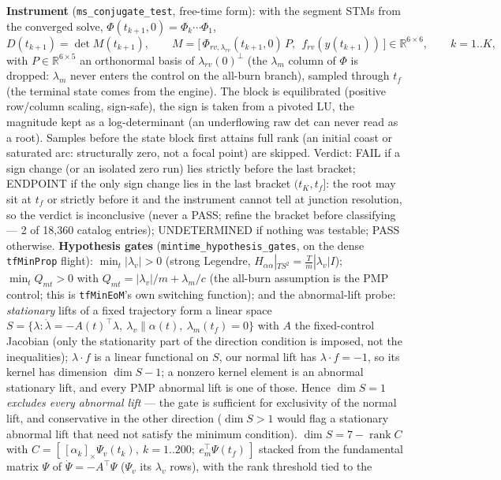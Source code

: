 \documentclass[11pt]{article}
\newcommand{\lv}{\lambda_v}\newcommand{\lr}{\lambda_r}\newcommand{\lm}{\lambda_m}
\newcommand{\tf}{t_f}\newcommand{\R}{\mathbb{R}}
\newcommand{\file}[1]{\texttt{#1}}
\newcommand{\Qmt}{Q_{mt}}
\begin{document}
\begin{rig}
\textbf{Instrument} (\file{ms\_conjugate\_test}, free-time form): with the
segment STMs from the converged solve, $\Phi(t_{k+1},0)=\Phi_k\cdots\Phi_1$,
\[
D(t_{k+1})=\det M(t_{k+1}),\qquad M=\big[\,\Phi_{rv,\lambda_{rv}}(t_{k+1},0)\,P,\ \ f_{rv}(y(t_{k+1}))\,\big]\in\R^{6\times6},\qquad k=1..K,
\]
with $P\in\R^{6\times5}$ an orthonormal basis of $\lambda_{rv}(0)^\perp$ (the $\lm$ column of $\Phi$ is dropped: $\lm$ never enters the control on the all-burn branch), sampled through $\tf$ (the terminal state comes from the engine). The block is
equilibrated (positive row/column scaling, sign-safe), the sign is taken from a
pivoted LU, the magnitude kept as a log-determinant (an underflowing raw det can
never read as a root). Samples before the state block first attains full rank
(an initial coast or saturated arc: structurally zero, not a focal point) are
skipped. Verdict: FAIL if a sign change (or an isolated zero run) lies strictly
before the last bracket; ENDPOINT if the only sign change lies in the last bracket $(t_K,\tf]$: the root may sit at $\tf$ or strictly before it and the instrument cannot tell at junction resolution, so the verdict is inconclusive (never a PASS; refine the bracket before classifying --- 2 of 18,360 catalog entries); UNDETERMINED
if nothing was testable; PASS otherwise.
\textbf{Hypothesis gates} (\file{mintime\_hypothesis\_gates}, on the dense
\file{tfMinProp} flight): $\min_t|\lv|>0$ (strong Legendre,
$H_{\alpha\alpha}|_{TS^2}=\frac{T}{m}|\lv|I$); $\min_t \Qmt>0$ with
$\Qmt=|\lv|/m+\lm/c$ (the all-burn assumption is the PMP control; this is
\file{tfMinEoM}'s own switching function); and the abnormal-lift probe: \emph{stationary} lifts of a fixed trajectory form a linear space $S=\{\lambda:\dot\lambda=-A(t)^{\!\top}\lambda,\ \lv\parallel\alpha(t),\ \lm(\tf)=0\}$ with $A$ the fixed-control Jacobian (only the stationarity part of the direction condition is imposed, not the inequalities); $\lambda\cdot f$ is a linear functional on $S$, our normal lift has $\lambda\cdot f=-1$, so its kernel has dimension $\dim S-1$; a nonzero kernel element is an abnormal stationary lift, and every PMP abnormal lift is one of those. Hence \emph{$\dim S=1$ excludes every abnormal lift} --- the gate is sufficient for exclusivity of the normal lift, and conservative in the other direction ($\dim S>1$ would flag a stationary abnormal lift that need not satisfy the minimum condition). $\dim S=7-\operatorname{rank}C$ with $C=[\,[\alpha_k]_\times\Psi_v(t_k),\ k=1..200;\ e_m^{\!\top}\Psi(\tf)\,]$ stacked from the fundamental matrix $\Psi$ of $\dot\Psi=-A^{\!\top}\Psi$ ($\Psi_v$ its $\lv$ rows), with the rank threshold tied to the

\end{rig}
\end{document}

